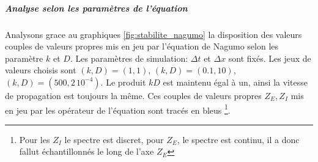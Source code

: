             \subparagraph{Analyse selon les paramètres de l'équation}
            Analysons grace au graphiques \ref{fig:stabilite_nagumo} la disposition des valeurs couples de valeurs 
            propres mis en jeu par l'équation de Nagumo selon les paramètre $k$ et $D$. Les paramètres de simulation: $\Delta t$ et $\Delta x$ sont fixés.
            Les jeux de valeurs choisis sont $(k,D)=(1,1)$, $(k,D)=(0.1,10)$, $(k,D)=(500,2\, 10^{-4})$. 
            Le produit $kD$ est maintenu égal à un, ainsi la vitesse de propagation est toujours la même.
            Ces couples de valeurs propres $Z_E,Z_I$ mis en jeu par les opérateur de l'équation sont tracés en bleus
            \footnote{Pour les $Z_I$ le spectre est discret, pour $Z_E$, le spectre est continu, il a donc fallut échantillonnés le long de l'axe $Z_E$}.
